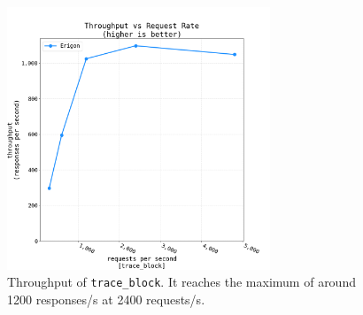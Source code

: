 \begin{figure}[H]
    \centering
    \includegraphics[width=0.7\textwidth]{Figures/results/load_tests/traces/throughput_trace.png}
    \caption{Throughput of {\tt trace\_block}. It reaches the maximum of around 1200 responses/s at 2400 requests/s. }
    \label{fig:traces-throughput}
\end{figure}

